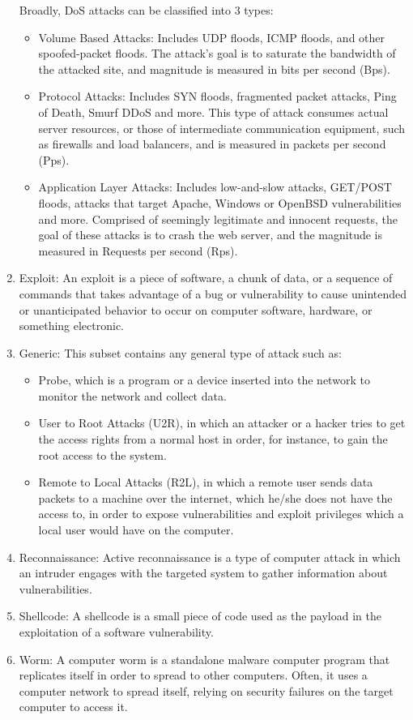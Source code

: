 \documentclass[a4paper,12pt]{article}
\begin{document}
\begin{enumerate}
                    Broadly, DoS attacks can be classified into 3 types:
                    \begin{itemize}
                        \item Volume Based Attacks: Includes UDP floods, ICMP floods, and other spoofed-packet floods. The attack’s goal is to saturate the bandwidth of the attacked site, and magnitude is measured in bits per second (Bps).
                        \item Protocol Attacks: Includes SYN floods, fragmented packet attacks, Ping of Death, Smurf DDoS and more. This type of attack consumes actual server resources, or those of intermediate communication equipment, such as firewalls and load balancers, and is measured in packets per second (Pps).
                        \item Application Layer Attacks: Includes low-and-slow attacks, GET/POST floods, attacks that target Apache, Windows or OpenBSD vulnerabilities and more. Comprised of seemingly legitimate and innocent requests, the goal of these attacks is to crash the web server, and the magnitude is measured in Requests per second (Rps).
                    \end{itemize}
                    \item Exploit: An exploit is a piece of software, a chunk of data, or a sequence of commands that takes advantage of a bug or vulnerability to cause unintended or unanticipated behavior to occur on computer software, hardware, or something electronic.
                    \item Generic: This subset contains any general type of attack such as:
                    \begin{itemize}
                        \item Probe, which is a program or a device inserted into the network to monitor the network and collect data.
                        \item User to Root Attacks (U2R), in which an attacker or a hacker tries to get the access rights from a normal host in order, for instance, to gain the root access to the system.
                        \item Remote to Local Attacks (R2L), in which a remote user sends data packets to a machine over the internet, which he/she does not have the access to, in order to expose vulnerabilities and exploit privileges which a local user would have on the computer.
                    \end{itemize}
                    \item Reconnaissance: Active reconnaissance is a type of computer attack in which an intruder engages with the targeted system to gather information about vulnerabilities.
                    \item Shellcode: A shellcode is a small piece of code used as the payload in the exploitation of a software vulnerability.
                    \item Worm: A computer worm is a standalone malware computer program that replicates itself in order to spread to other computers. Often, it uses a computer network to spread itself, relying on security failures on the target computer to access it.
                \end{enumerate}
\end{document}
